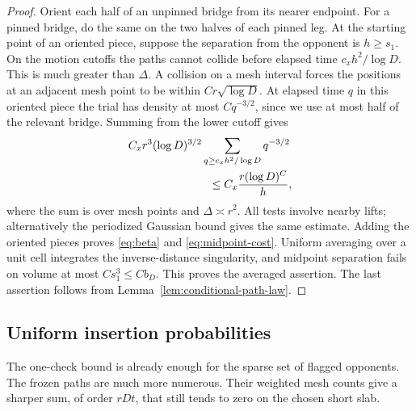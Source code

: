 \begin{proof}
Orient each half of an unpinned bridge from its nearer endpoint.  For
a pinned bridge, do the same on the two halves of each pinned leg.
At the starting point of an oriented piece, suppose the separation
from the opponent is $h\ge s_1$.  On the motion cutoffs the paths
cannot collide before elapsed time
$c_xh^2/\log D$.  This is much greater than $\Delta$.  A collision on
a mesh interval forces the positions at an adjacent mesh point to be
within $Cr\sqrt{\log D}$.  At elapsed time $q$ in this oriented
piece the trial has density at most $Cq^{-3/2}$, since we use at most
half of the relevant bridge.  Summing from the lower cutoff gives
\[
 \begin{split}
 &C_xr^3(\log D)^{3/2}
       \sum_{q\ge c_xh^2/\log D}q^{-3/2}\\
 &\hspace{25mm}\le
       C_x\frac{r(\log D)^C}{h},
 \end{split}
\]
where the sum is over mesh points and $\Delta\asymp r^2$.
All tests involve nearby lifts; alternatively the periodized Gaussian
bound gives the same estimate.  Adding the oriented pieces proves
\eqref{eq:beta} and \eqref{eq:midpoint-cost}.  Uniform averaging over a
unit cell integrates the inverse-distance singularity, and midpoint
separation fails on volume at most $Cs_1^3\le Cb_D$.  This proves the
averaged assertion.  The last assertion follows from
Lemma~\ref{lem:conditional-path-law}.
\end{proof}

\subsection{Uniform insertion probabilities}

The one-check bound is already enough for the sparse set of flagged
opponents.  The frozen paths are much more numerous.  Their weighted
mesh counts give a sharper sum, of order $rDt$, that still tends to
zero on the chosen short slab.

